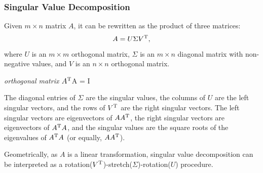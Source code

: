 \documentclass[letterpaper, 11pt]{article}
\providecommand{\trans}[1]{\ensuremath{{#1}^{\rm T}}}
\numberwithin{equation}{section}
\begin{document}
\subsubsection{Singular Value Decomposition}
\label{sec:org4694fd9}
Given \(m \times n\) matrix \(A\), it can be rewritten as the product of three matrices:
\begin{equation}
\label{eq-la-svd}
A = U\Sigma\trans{V},
\end{equation} 
where \(U\) is an \(m \times m\) orthogonal matrix, \(\Sigma\) is an \(m \times n\) diagonal matrix with non-negative values, and \(V\) is an \(n \times n\) orthogonal matrix.
\begin{margintable}
\textit{\footnotesize orthogonal matrix}
\footnotesize{
\trans{A}A = I}
\end{margintable}
The diagonal entries of \(\Sigma\) are the singular values, the columns of \(U\) are the left singular vectors, and the rows of \trans{V} are the right
singular vectors. The left singular vectors are eigenvectors of \(A\trans{A}\), the right singular vectors are eigenvectors of \(\trans{A}A\), and the
singular values are the square roots of the eigenvalues of \(\trans{A}A\) (or equally, \(A\trans{A}\)).
\begin{margintable}
\footnotesize{
\begin{align*}
&\trans{A}A = V\trans{\Sigma}\trans{U}U\Sigma\trans{V} = V\Sigma^2\trans{V}\\
&A\trans{A} = U\Sigma\trans{V}V\trans{\Sigma}\trans{U} = U\Sigma^2\trans{U}
\end{align*}
\end{margintable}
Geometrically, as \(A\) is a linear transformation, singular value decomposition can be interpreted as a rotation(\trans{V})-stretch(\(\Sigma\))-rotation(\(U\)) procedure.
\end{document}

